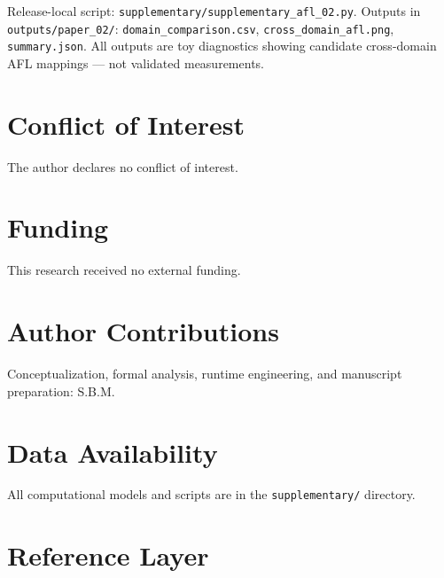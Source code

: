 \documentclass[11pt]{article}
\begin{document}
Release-local script: \texttt{supplementary/supplementary\_afl\_02.py}. Outputs in \texttt{outputs/paper\_02/}: \texttt{domain\_comparison.csv}, \texttt{cross\_domain\_afl.png}, \texttt{summary.json}. All outputs are toy diagnostics showing candidate cross-domain AFL mappings — not validated measurements.

\section*{Conflict of Interest} The author declares no conflict of interest.
\section*{Funding} This research received no external funding.
\section*{Author Contributions} Conceptualization, formal analysis, runtime engineering, and manuscript preparation: S.B.M.
\section*{Data Availability} All computational models and scripts are in the \texttt{supplementary/} directory.

\section{Reference Layer}


\end{document}

